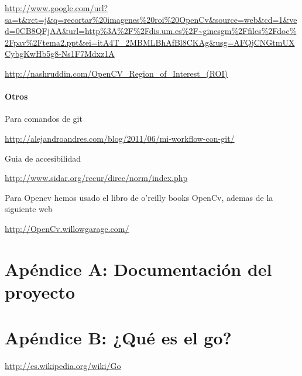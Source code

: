 \documentclass[12pt,a4paper]{report}
\begin{document}
\url{http://www.google.com/url?sa=t&rct=j&q=recortar%20imagenes%20roi%20OpenCv&source=web&cd=1&ved=0CB8QFjAA&url=http%3A%2F%2Fdis.um.es%2F~ginesgm%2Ffiles%2Fdoc%2Fpav%2Ftema2.ppt&ei=itA4T_2MBMLBhAfBl8CKAg&usg=AFQjCNGtmUXCybgKwHb5g8-Ns1F7Mdxz1A}

\url{http://nashruddin.com/OpenCV_Region_of_Interest_(ROI)}

\subsubsection{Otros}

Para comandos de git

\url{http://alejandroandres.com/blog/2011/06/mi-workflow-con-git/}

Guia de accesibilidad 

\url{http://www.sidar.org/recur/direc/norm/index.php}

Para Opencv hemos usado el libro de o'reilly books OpenCv, ademas de la
siguiente web

\url{http://OpenCv.willowgarage.com/}

\chapter{Apéndice A: Documentación del proyecto} 



\chapter{Apéndice B: ¿Qué es el go?} 
\url{http://es.wikipedia.org/wiki/Go}
\end{document}
